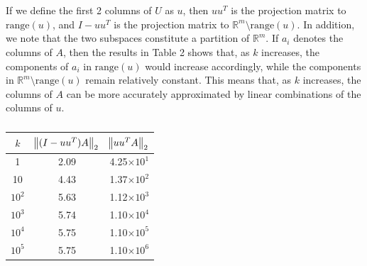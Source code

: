 \documentclass[11pt]{article}
\begin{document}
\section{}
If we define the first 2 columns of $U$ as $u$, then $uu^T$ is the projection matrix to $\text{range}(u)$, and $I-uu^T$ is the projection matrix to $\mathbb{R}^m\text{\textbackslash range}(u)$. In addition, we note that the two subspaces constitute a partition of $\mathbb{R}^m$. If $a_i$ denotes the columns of $A$, then the results in Table 2 shows that, as $k$ increases, the components of $a_i$ in $\text{range}(u)$ would increase accordingly, while the components in $\mathbb{R}^m\text{\textbackslash range}(u)$ remain relatively constant. This means that, as $k$ increases, the columns of $A$ can be more accurately approximated by linear combinations of the columns of $u$. 
\begin{center}
\begin{table}
\caption{}
\centering
\begin{tabular}[t]{ | c | c c |}
\hline
$k$ & $\norm{(I-uu^T)A}_2$  & $\norm{uu^TA}_2$\\[0.25cm]
\hline
 1 & 2.09 & 4.25$\times10^1$\\ 
 10 & 4.43 & 1.37$\times10^2$\\
 $10^2$ & 5.63 & 1.12$\times10^3$\\ 
 $10^3$ & 5.74 & 1.10$\times10^4$\\ 
 $10^4$ & 5.75 & 1.10$\times10^5$\\ 
 $10^5$ & 5.75 & 1.10$\times10^6$\\
 \hline
\end{tabular}
\end{table}
\end{center}
\end{document}
